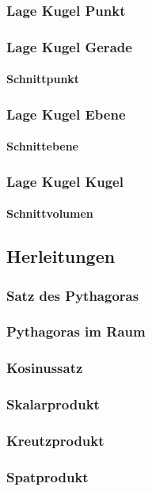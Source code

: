 \documentclass[a4paper]{article} %
\begin{document}
	\subsubsection{Lage Kugel Punkt}
	\subsubsection{Lage Kugel Gerade}
	\paragraph{Schnittpunkt}
	\subsubsection{Lage Kugel Ebene}
	\paragraph{Schnittebene}
	\subsubsection{Lage Kugel Kugel}
	\paragraph{Schnittvolumen}
	\subsection{Herleitungen}
	\subsubsection{Satz des Pythagoras}
	\subsubsection{Pythagoras im Raum}
	\subsubsection{Kosinussatz}
	\subsubsection{Skalarprodukt}
	\subsubsection{Kreutzprodukt}
	\subsubsection{Spatprodukt}
\end{document}
